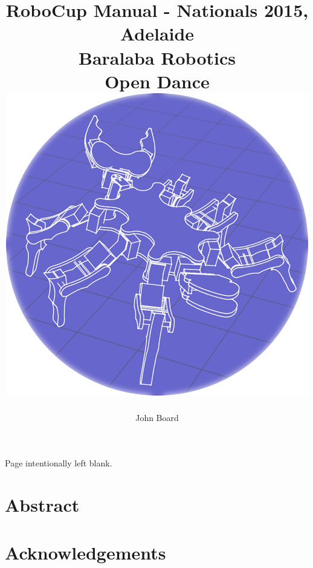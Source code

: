 \documentclass[12pt]{report}
\begin{document}
    \begin{titlepage}
        \title{
            {RoboCup Manual - Nationals 2015, Adelaide}\\
            {\large Baralaba Robotics}\\
            {\large Open Dance}\\
            [1.25cm]
            {\includegraphics[width=0.5\linewidth]{images/Feathering.png}}
        }
        \author{John Board}
        \maketitle
    \end{titlepage}
    
    \pagebreak
    \vspace{10cm}
    \centerline{Page intentionally left blank.}
    \pagebreak 
    
    
    \setcounter{page}{1}
    
    \chapter*{Abstract}
        
    
    \chapter*{Acknowledgements}
        
    
    
    \tableofcontents
    \pagebreak
    
    
\end{document}
